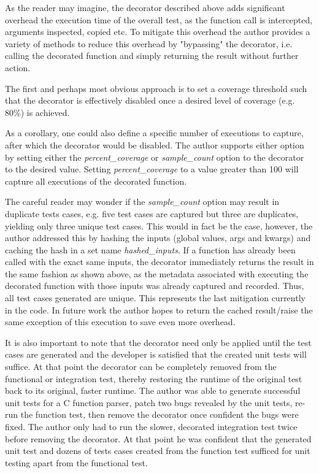 As the reader may imagine, the decorator described above adds significant overhead 
the execution time of the overall test, as the function call is intercepted,
arguments inspected, copied etc.  To mitigate this overhead the author provides 
a variety of methods to 
reduce this overhead by "bypassing" the decorator, i.e. calling the decorated 
function and simply returning the result without further action.

The first and perhaps most obvious approach is to set a coverage threshold such 
that the decorator is effectively disabled once a desired level of coverage 
(e.g. 80\%) is achieved. 

As a corollary, one could also define a specific number 
of executions to capture, after which the decorator would be disabled. 
The author supports either option by setting either the \textit{percent\_coverage} or 
\textit{sample\_count} option to the decorator to the desired value.  Setting 
\textit{percent\_coverage} to a value greater than 100 will capture all 
executions of the decorated function.


The careful reader may wonder if the \textit{sample\_count} option may result in 
duplicate tests cases, e.g. five test cases are captured but three are duplicates, 
yielding only three unique test cases.  This would in fact be the case, however, the author 
addressed this by hashing the inputs (global values, args and kwargs) and 
caching the hash in a set name \textit{hashed\_inputs}.  If a function has
already been called with the exact same inputs, the decorator immediately returns
the result in the same fashion as shown above, as the metadata associated with
 executing the decorated function
with those inputs was already captured and recorded.  Thus, all test cases 
generated are unique.  This represents the last mitigation
currently in the code.  In future work the author hopes to return the cached 
result/raise the same exception of this execution to save even more overhead.  

It is also important to note that the decorator need only be applied until the 
test cases are generated and the developer is satisfied that the created unit
tests will suffice.  At that point the decorator can be completely removed
from the functional or integration test, thereby restoring the runtime of
the original test back to its original, faster runtime.  The author 
was able to generate successful unit tests for a C function parser, patch two
bugs revealed by the unit tests, re-run the function test, then remove 
the decorator once confident the bugs were fixed.  The author only had to run 
the slower, decorated integration test twice before removing the decorator.
At that point he was confident that the generated unit test and dozens of 
tests cases created from the function test sufficed for unit testing apart 
from the functional test.

